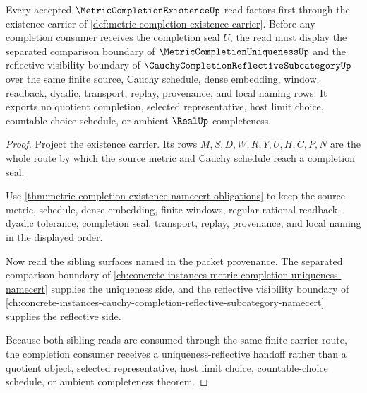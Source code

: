 \begin{theorem}
\label{thm:metric-completion-existence-uniqueness-reflective-route}
Every accepted $\MetricCompletionExistenceUp$ read factors first through the existence carrier of \autoref{def:metric-completion-existence-carrier}. Before any completion consumer receives the completion seal $U$, the read must display the separated comparison boundary of $\MetricCompletionUniquenessUp$ and the reflective visibility boundary of $\CauchyCompletionReflectiveSubcategoryUp$ over the same finite source, Cauchy schedule, dense embedding, window, readback, dyadic, transport, replay, provenance, and local naming rows. It exports no quotient completion, selected representative, host limit choice, countable-choice schedule, or ambient $\RealUp$ completeness.
\end{theorem}
\begin{proof}
Project the existence carrier. Its rows $M,S,D,W,R,Y,U,H,C,P,N$ are the whole route by which the source metric and Cauchy schedule reach a completion seal.

Use \autoref{thm:metric-completion-existence-namecert-obligations} to keep the source metric, schedule, dense embedding, finite windows, regular rational readback, dyadic tolerance, completion seal, transport, replay, provenance, and local naming in the displayed order.

Now read the sibling surfaces named in the packet provenance. The separated comparison boundary of \autoref{ch:concrete-instances-metric-completion-uniqueness-namecert} supplies the uniqueness side, and the reflective visibility boundary of \autoref{ch:concrete-instances-cauchy-completion-reflective-subcategory-namecert} supplies the reflective side.

Because both sibling reads are consumed through the same finite carrier route, the completion consumer receives a uniqueness-reflective handoff rather than a quotient object, selected representative, host limit choice, countable-choice schedule, or ambient completeness theorem.
\end{proof}
